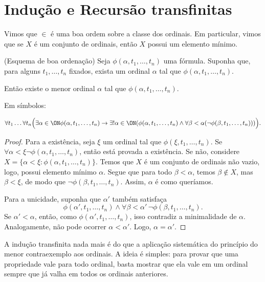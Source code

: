 \section{Indução e Recursão transfinitas}\label{sec:inducaoERecursaoTransfinitas}
Vimos que $\in$ é uma boa ordem sobre a classe dos ordinais.
Em particular, vimos que se $X$ é um conjunto de ordinais, então $X$ possui um elemento mínimo.

\begin{proposition}[$\BST$](Esquema de boa ordenação)\label{prop:esquemaDaBoaOrdenacao}
    Seja $\phi(\alpha, t_1, \dots, t_n)$ uma fórmula.
    Suponha que, para alguns $t_1, \dots, t_n$ fixados, exista um ordinal $\alpha$ tal que $\phi(\alpha, t_1, \dots, t_n)$.

    Então existe o menor ordinal $\alpha$ tal que $\phi(\alpha, t_1, \dots, t_n)$.

    Em símbolos:

    \[
        \forall t_1 \dots \forall t_n \Big( \exists \alpha \in \ON \phi(\alpha, t_1, \dots, t_n) \rightarrow \exists! \alpha \in \ON (\phi(\alpha, t_1, \dots, t_n) \wedge \forall \beta <\alpha (\neg\phi(\beta, t_1, \dots, t_n)))\Big).
    \]
\end{proposition}
\begin{proof}
    Para a existência, seja $\xi$ um ordinal tal que $\phi(\xi, t_1, \dots, t_n)$.
    Se $\forall \alpha <\xi \neg\phi(\alpha, t_1, \dots, t_n)$, então está provada a existência.
    Se não, considere $X=\{\alpha <\xi : \phi(\alpha, t_1, \dots, t_n)\}$.
    Temos que $X$ é um conjunto de ordinais não vazio, logo, possui elemento mínimo $\alpha$.
    Segue que para todo $\beta<\alpha$, temos $\beta\notin X$, mas $\beta<\xi$, de modo que $\neg\phi(\beta, t_1, \dots, t_n)$.
    Assim, $\alpha$ é como queríamos.

    Para a unicidade, suponha que $\alpha'$ também satisfaça
    \[
        \phi(\alpha', t_1,\dots,t_n)\land \forall \beta<\alpha'\,\neg\phi(\beta,t_1,\dots,t_n).
    \]
    Se $\alpha'<\alpha$, então, como $\phi(\alpha', t_1,\dots,t_n)$, isso contradiz a minimalidade de $\alpha$.
    Analogamente, não pode ocorrer $\alpha<\alpha'$.
    Logo, $\alpha=\alpha'$.
\end{proof}

A indução transfinita nada mais é do que a aplicação sistemática do princípio do menor contraexemplo aos ordinais. A ideia é simples: para provar que uma propriedade vale para todo ordinal, basta mostrar que ela vale em um ordinal sempre que já valha em todos os ordinais anteriores.

